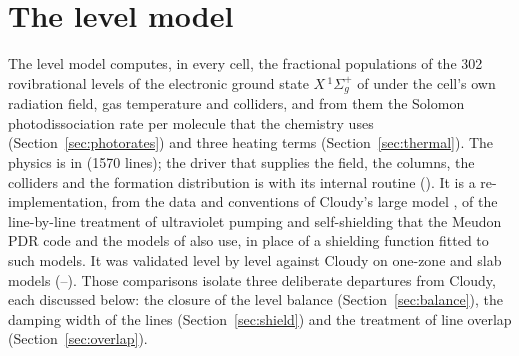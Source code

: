 \section{The \texorpdfstring{\Htwo}{H2} level model}
\label{sec:h2model}

The level model computes, in every cell, the fractional populations of the
302 rovibrational levels of the electronic ground state $X\,^1\Sigma_g^+$ of
\Htwo{} under the cell's own radiation field, gas temperature and colliders,
and from them the Solomon photodissociation rate per molecule that the
chemistry uses (Section~\ref{sec:photorates}) and three \Htwo{} heating terms
(Section~\ref{sec:thermal}). The physics is in  (1570 lines);
the driver that supplies the field, the columns, the colliders and the
formation distribution is  with its internal routine
 (). It is a re-implementation,
from the data and conventions of Cloudy's large \Htwo{} model
\citep{Shaw2005}, of the line-by-line treatment of ultraviolet pumping and
self-shielding that the Meudon PDR code \citep{LePetit2006} and the models of
\citet{DraineBertoldi1996} also use, in place of a shielding function fitted
to such models. It was validated level by level against Cloudy on one-zone and
slab models (--). Those comparisons isolate three
deliberate departures from Cloudy, each discussed below: the closure of the
level balance (Section~\ref{sec:balance}), the damping width of the lines
(Section~\ref{sec:shield}) and the treatment of line overlap
(Section~\ref{sec:overlap}).

